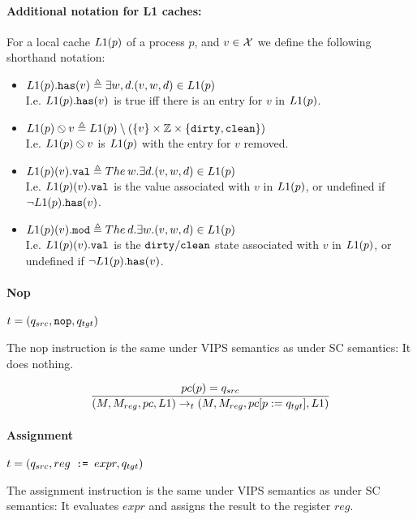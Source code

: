 \documentclass[a4paper]{article}
\begin{document}
\paragraph{Additional notation for L1 caches:} For a local cache $\lone(p)$ of a process $p$, and $v\in\vars$ we define the following shorthand notation:
\begin{itemize}
\item $\inlone{v}{\lone(p)} \triangleq \exists w, d . (v,w,d) \in \lone(p)$\\
  I.e. $\inlone{v}{\lone(p)}$ is true iff there is an entry for $v$ in $\lone(p)$.
\item $\lonerem{\lone(p)}{v} \triangleq \lone(p) \setminus (\{v\}\times\mathbb{Z}\times\{\dirty,\clean\})$\\
  I.e. $\lonerem{\lone(p)}{v}$ is $\lone(p)$ with the entry for $v$ removed.
\item $\lonevalof{\lone(p)}{v} \triangleq \theunique w . \exists d . (v,w,d)\in \lone(p)$\\
  I.e. $\lonevalof{\lone(p)}{v}$ is the value associated with $v$ in $\lone(p)$, or undefined if $\notinlone{v}{\lone(p)}$.
\item $\lonemodof{\lone(p)}{v} \triangleq \theunique d . \exists w . (v,w,d)\in \lone(p)$\\
  I.e. $\lonevalof{\lone(p)}{v}$ is the $\dirty/\clean$ state associated with $v$ in $\lone(p)$, or undefined if $\notinlone{v}{\lone(p)}$.
\end{itemize}

\paragraph{Nop} $t = (q_{src},\verb+nop+,q_{tgt})$

The nop instruction is the same under VIPS semantics as under SC
semantics: It does nothing.

\begin{displaymath}
  \frac{
    \pc(p) = q_{src}
  }{(\mem,\regval,\pc,\lone) \rightarrow_t (\mem,\regval,\pc[p:=q_{tgt}],\lone)}
\end{displaymath}

\paragraph{Assignment} $t = (q_{src},reg\verb+ := +expr, q_{tgt})$

The assignment instruction is the same under VIPS semantics as under SC
semantics: It evaluates $expr$ and assigns the result to the register
$reg$.
\end{document}
